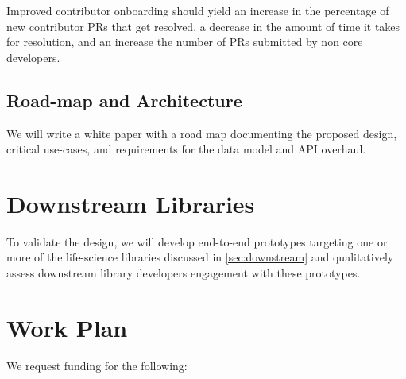 \documentclass[11pt,letterpaper]{article}  %
\begin{document}
Improved contributor onboarding should yield an increase in the percentage of new contributor PRs that get resolved, a decrease in the amount of time it takes for resolution, and an increase the number of PRs submitted by non core developers. 


\subsection{Road-map and Architecture}

We will write a white paper with a road map documenting the proposed design, critical use-cases, and requirements for the data model and API overhaul.


\section{Downstream Libraries}
To validate the design, we will develop end-to-end prototypes targeting one or more of the life-science libraries discussed in \ref{sec:downstream} and qualitatively assess downstream library developers engagement with these prototypes.

\section{Work Plan}

We request funding for the following:
\end{document}
